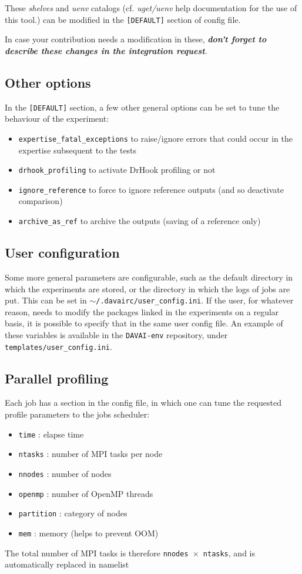 \documentclass[a4paper,10pt,twoside]{article}
\begin{document}
These \textit{shelves} and \textit{uenv} catalogs (cf. \textit{uget/uenv} help documentation for the use of this tool.) can be modified in the \texttt{[DEFAULT]} section of config file.

In case your contribution needs a modification in these, \textbf{\textit{don't forget to describe these changes in the integration request}}.



\subsection{Other options}
In the \texttt{[DEFAULT]} section, a few other general options can be set to tune the behaviour of the experiment:
\begin{itemize}
 \item \texttt{expertise\_fatal\_exceptions} to raise/ignore errors that could occur in the expertise subsequent to the tests
 \item \texttt{drhook\_profiling} to activate DrHook profiling or not
 \item \texttt{ignore\_reference} to force to ignore reference outputs (and so deactivate comparison)
 \item \texttt{archive\_as\_ref} to archive the outputs (saving of a reference only)
\end{itemize}


\subsection{User configuration}
Some more general parameters are configurable, such as the default directory in which the experiments are stored, or the directory in which the logs of jobs are put. This can be set in \texttt{$\sim$/.davairc/user\_config.ini}.
If the user, for whatever reason, needs to modify the packages linked in the experiments on a regular basis, it is possible to specify that in the same user config file.
An example of these variables is available in the \texttt{DAVAI-env} repository, under \texttt{templates/user\_config.ini}.


\subsection{Parallel profiling}
Each job has a section in the config file, in which one can tune the requested profile parameters to the jobs scheduler:
\begin{itemize}
 \item \texttt{time} : elapse time
 \item \texttt{ntasks} : number of MPI tasks per node
 \item \texttt{nnodes} : number of nodes
 \item \texttt{openmp} : number of OpenMP threads
 \item \texttt{partition} : category of nodes
 \item \texttt{mem} : memory (helps to prevent OOM)
\end{itemize}
The total number of MPI tasks is therefore \texttt{nnodes $\times$ ntasks}, and is automatically replaced in namelist
\end{document}
